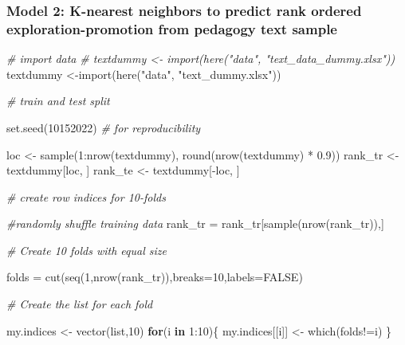 \documentclass[
  english,
  man]{apa6}
\newenvironment{Shaded}{\begin{snugshade}}{\end{snugshade}}
\newcommand{\AttributeTok}[1]{\textcolor[rgb]{0.77,0.63,0.00}{#1}}
\newcommand{\CommentTok}[1]{\textcolor[rgb]{0.56,0.35,0.01}{\textit{#1}}}
\newcommand{\ConstantTok}[1]{\textcolor[rgb]{0.00,0.00,0.00}{#1}}
\newcommand{\ControlFlowTok}[1]{\textcolor[rgb]{0.13,0.29,0.53}{\textbf{#1}}}
\newcommand{\DecValTok}[1]{\textcolor[rgb]{0.00,0.00,0.81}{#1}}
\newcommand{\FloatTok}[1]{\textcolor[rgb]{0.00,0.00,0.81}{#1}}
\newcommand{\FunctionTok}[1]{\textcolor[rgb]{0.00,0.00,0.00}{#1}}
\newcommand{\NormalTok}[1]{#1}
\newcommand{\OtherTok}[1]{\textcolor[rgb]{0.56,0.35,0.01}{#1}}
\newcommand{\SpecialCharTok}[1]{\textcolor[rgb]{0.00,0.00,0.00}{#1}}
\newcommand{\StringTok}[1]{\textcolor[rgb]{0.31,0.60,0.02}{#1}}
\begin{document}
\hypertarget{model-2-k-nearest-neighbors-to-predict-rank-ordered-exploration-promotion-from-pedagogy-text-sample}{%
\subsubsection{Model 2: K-nearest neighbors to predict rank ordered exploration-promotion from pedagogy text sample}\label{model-2-k-nearest-neighbors-to-predict-rank-ordered-exploration-promotion-from-pedagogy-text-sample}}

\begin{Shaded}
\begin{Highlighting}[]
\CommentTok{\# import data}
\CommentTok{\# textdummy \textless{}{-} import(here("data", "text\_data\_dummy.xlsx"))}
\NormalTok{ textdummy }\OtherTok{\textless{}{-}}\FunctionTok{import}\NormalTok{(}\FunctionTok{here}\NormalTok{(}\StringTok{"data"}\NormalTok{, }\StringTok{"text\_dummy.xlsx"}\NormalTok{))}

\CommentTok{\# train and test split}

\FunctionTok{set.seed}\NormalTok{(}\DecValTok{10152022}\NormalTok{) }\CommentTok{\# for reproducibility}

\NormalTok{loc }\OtherTok{\textless{}{-}} \FunctionTok{sample}\NormalTok{(}\DecValTok{1}\SpecialCharTok{:}\FunctionTok{nrow}\NormalTok{(textdummy), }\FunctionTok{round}\NormalTok{(}\FunctionTok{nrow}\NormalTok{(textdummy) }\SpecialCharTok{*} \FloatTok{0.9}\NormalTok{))}
\NormalTok{rank\_tr }\OtherTok{\textless{}{-}}\NormalTok{ textdummy[loc, ]}
\NormalTok{rank\_te }\OtherTok{\textless{}{-}}\NormalTok{ textdummy[}\SpecialCharTok{{-}}\NormalTok{loc, ]}


\CommentTok{\# create row indices for 10{-}folds}

  \CommentTok{\#randomly shuffle training data}
\NormalTok{rank\_tr }\OtherTok{=}\NormalTok{ rank\_tr[}\FunctionTok{sample}\NormalTok{(}\FunctionTok{nrow}\NormalTok{(rank\_tr)),]}

    \CommentTok{\# Create 10 folds with equal size}

\NormalTok{      folds }\OtherTok{=} \FunctionTok{cut}\NormalTok{(}\FunctionTok{seq}\NormalTok{(}\DecValTok{1}\NormalTok{,}\FunctionTok{nrow}\NormalTok{(rank\_tr)),}\AttributeTok{breaks=}\DecValTok{10}\NormalTok{,}\AttributeTok{labels=}\ConstantTok{FALSE}\NormalTok{)}
  
    \CommentTok{\# Create the list for each fold }
      
\NormalTok{      my.indices }\OtherTok{\textless{}{-}} \FunctionTok{vector}\NormalTok{(}\StringTok{\textquotesingle{}list\textquotesingle{}}\NormalTok{,}\DecValTok{10}\NormalTok{)}
      \ControlFlowTok{for}\NormalTok{(i }\ControlFlowTok{in} \DecValTok{1}\SpecialCharTok{:}\DecValTok{10}\NormalTok{)\{}
\NormalTok{        my.indices[[i]] }\OtherTok{\textless{}{-}} \FunctionTok{which}\NormalTok{(folds}\SpecialCharTok{!=}\NormalTok{i)}
\NormalTok{      \}}


\end{Highlighting}
\end{Shaded}
\end{document}
